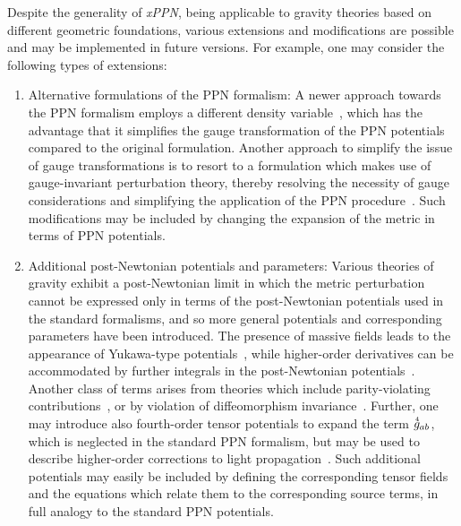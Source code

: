 \documentclass[notitlepage,a4paper,aps,prd,onecolumn,superscriptaddress,nofootinbib,groupedaddress,longbibliography]{revtex4-1}
\newcommand{\order}[2]{\accentset{#2}{#1}}
\newcommand{\xPPN}{\emph{xPPN}}
\begin{document}
Despite the generality of \xPPN, being applicable to gravity theories based on different geometric foundations, various extensions and modifications are possible and may be implemented in future versions. For example, one may consider the following types of extensions:
\begin{enumerate}
\item
Alternative formulations of the PPN formalism: A newer approach towards the PPN formalism employs a different density variable~\cite[Sec. 4]{Will:2018bme}, which has the advantage that it simplifies the gauge transformation of the PPN potentials compared to the original formulation. Another approach to simplify the issue of gauge transformations is to resort to a formulation which makes use of gauge-invariant perturbation theory, thereby resolving the necessity of gauge considerations and simplifying the application of the PPN procedure~\cite{Hohmann:2019qgo}. Such modifications may be included by changing the expansion of the metric in terms of PPN potentials.

\item
Additional post-Newtonian potentials and parameters: Various theories of gravity exhibit a post-Newtonian limit in which the metric perturbation cannot be expressed only in terms of the post-Newtonian potentials used in the standard formalisms, and so more general potentials and corresponding parameters have been introduced. The presence of massive fields leads to the appearance of Yukawa-type potentials~\cite{Zaglauer:1990yh,Helbig:1991pk}, while higher-order derivatives can be accommodated by further integrals in the post-Newtonian potentials~\cite{Gladchenko:1990nw,Gladchenko:1994wu}. Another class of terms arises from theories which include parity-violating contributions~\cite{Alexander:2007zg,Alexander:2007vt,Alexander:2009tp}, or by violation of diffeomorphism invariance~\cite{Lin:2012bs,Lin:2012ea,Lin:2013tua}. Further, one may introduce also fourth-order tensor potentials to expand the term \(\order{g}{4}_{ab}\), which is neglected in the standard PPN formalism, but may be used to describe higher-order corrections to light propagation~\cite{Richter:1982zz,Richter:1982zza}. Such additional potentials may easily be included by defining the corresponding tensor fields and the equations which relate them to the corresponding source terms, in full analogy to the standard PPN potentials.


\end{enumerate}
\end{document}
